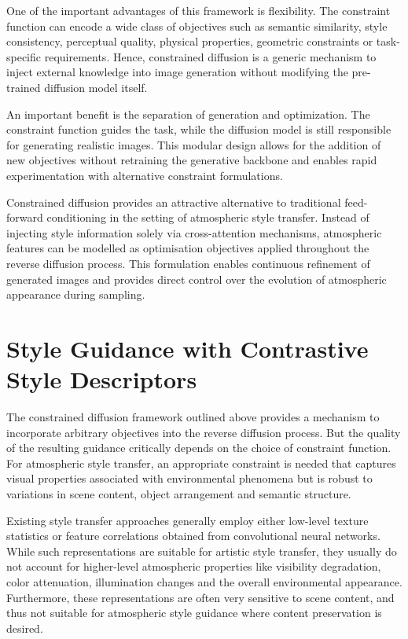 One of the important advantages of this framework is flexibility. The constraint function can encode a wide class of objectives such as semantic similarity, style consistency, perceptual quality, physical properties, geometric constraints or task-specific requirements. Hence, constrained diffusion is a generic mechanism to inject external knowledge into image generation without modifying the pre-trained diffusion model itself.

An important benefit is the separation of generation and optimization. The constraint function guides the task, while the diffusion model is still responsible for generating realistic images. This modular design allows for the addition of new objectives without retraining the generative backbone and enables rapid experimentation with alternative constraint formulations.

Constrained diffusion provides an attractive alternative to traditional feed-forward conditioning in the setting of atmospheric style transfer. Instead of injecting style information solely via cross-attention mechanisms, atmospheric features can be modelled as optimisation objectives applied throughout the reverse diffusion process. This formulation enables continuous refinement of generated images and provides direct control over the evolution of atmospheric appearance during sampling.

\FloatBarrier
\section{Style Guidance with Contrastive Style Descriptors}
\label{sec:ch7_csd_guidance}

The constrained diffusion framework outlined above provides a mechanism to incorporate arbitrary objectives into the reverse diffusion process. But the quality of the resulting guidance critically depends on the choice of constraint function. For atmospheric style transfer, an appropriate constraint is needed that captures visual properties associated with environmental phenomena but is robust to variations in scene content, object arrangement and semantic structure.

Existing style transfer approaches generally employ either low-level texture statistics or feature correlations obtained from convolutional neural networks. While such representations are suitable for artistic style transfer, they usually do not account for higher-level atmospheric properties like visibility degradation, color attenuation, illumination changes and the overall environmental appearance. Furthermore, these representations are often very sensitive to scene content, and thus not suitable for atmospheric style guidance where content preservation is desired.

